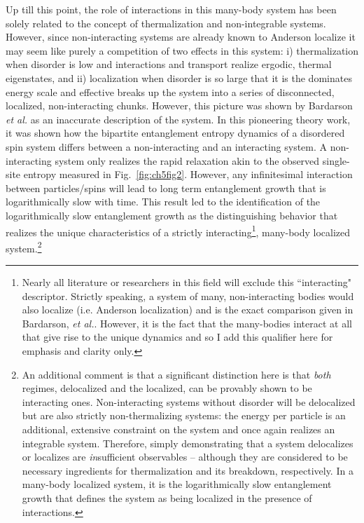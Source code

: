 Up till this point, the role of interactions in this many-body system has been solely related to the concept of thermalization and non-integrable systems. However, since non-interacting systems are already known to Anderson localize it may seem like purely a competition of two effects in this system: i) thermalization when disorder is low and interactions and transport realize ergodic, thermal eigenstates, and ii) localization when disorder is so large that it is the dominates energy scale and effective breaks up the system into a series of disconnected, localized, non-interacting chunks. However, this picture was shown by Bardarson \emph{et al.}\cite{Bardarson2012} as an inaccurate description of the system. In this pioneering theory work, it was shown how the bipartite entanglement entropy dynamics of a disordered spin system differs between a non-interacting and an interacting system. A non-interacting system only realizes the rapid relaxation akin to the observed single-site entropy measured in Fig.~\ref{fig:ch5fig2}. However, any infinitesimal interaction between particles/spins will lead to long term entanglement growth that is logarithmically slow with time. This result led to the identification of the logarithmically slow entanglement growth as the distinguishing behavior that realizes the unique characteristics of a strictly interacting\footnote{Nearly all literature or researchers in this field will exclude this ``interacting" descriptor. Strictly speaking, a system of many, non-interacting bodies would also localize (i.e. Anderson localization) and is the exact comparison given in Bardarson, \emph{et al.}. However, it is the fact that the many-bodies interact at all that give rise to the unique dynamics and so I add this qualifier here for emphasis and clarity only.}, many-body localized system.\footnote{An additional comment is that a significant distinction here is that \emph{both} regimes, delocalized and the localized, can be provably shown to be interacting ones. Non-interacting systems without disorder will be delocalized but are also strictly non-thermalizing systems: the energy per particle is an additional, extensive constraint on the system and once again realizes an integrable system. Therefore, simply demonstrating that a system delocalizes or localizes are \emph{in}sufficient observables -- although they are considered to be necessary ingredients for thermalization and its breakdown, respectively. In a many-body localized system, it is the logarithmically slow entanglement growth that defines the system as being localized in the presence of interactions.}

